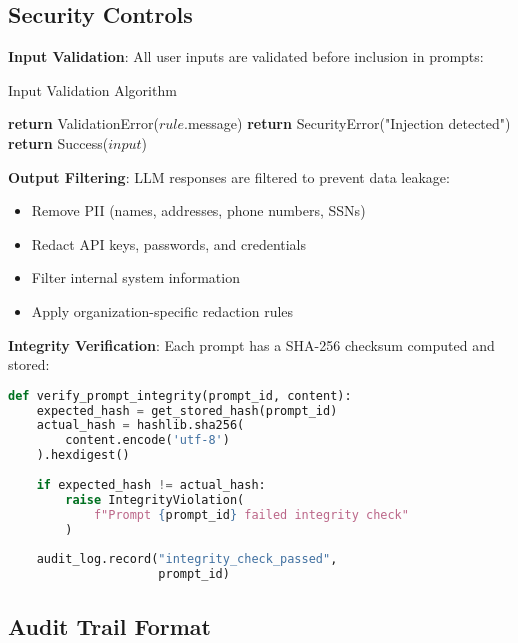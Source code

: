 \subsection{Security Controls}

\textbf{Input Validation}: All user inputs are validated before inclusion in prompts:

\begin{algorithm}
\caption{Input Validation Algorithm}
\begin{algorithmic}[1]
            \State \textbf{return} ValidationError($rule$.message)
        \EndIf
    \EndFor
        \State \textbf{return} SecurityError("Injection detected")
    \EndIf
    \State \textbf{return} Success($input$)
\EndProcedure
\end{algorithmic}
\end{algorithm}

\textbf{Output Filtering}: LLM responses are filtered to prevent data leakage:

\begin{itemize}
    \item Remove PII (names, addresses, phone numbers, SSNs)
    \item Redact API keys, passwords, and credentials
    \item Filter internal system information
    \item Apply organization-specific redaction rules
\end{itemize}

\textbf{Integrity Verification}: Each prompt has a SHA-256 checksum computed and stored:

\begin{lstlisting}[language=Python,caption=Integrity Check Example]
def verify_prompt_integrity(prompt_id, content):
    expected_hash = get_stored_hash(prompt_id)
    actual_hash = hashlib.sha256(
        content.encode('utf-8')
    ).hexdigest()
    
    if expected_hash != actual_hash:
        raise IntegrityViolation(
            f"Prompt {prompt_id} failed integrity check"
        )
    
    audit_log.record("integrity_check_passed", 
                     prompt_id)
\end{lstlisting}

\subsection{Audit Trail Format}

